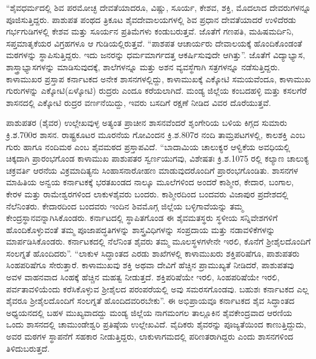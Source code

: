 “ಶೈವಧರ್ಮದಲ್ಲಿ ಶಿವ ಪರಮೋಚ್ಛ ದೇವತೆಯಾದರೂ, ವಿಷ್ಣು, ಸೂರ್ಯ, ಕೇಶವ, ಶಕ್ತಿ, ಮೊದಲಾದ ದೇವರುಗಳನ್ನೂ ಪೂಜಿಸುತ್ತಿದ್ದರು. ಪಾಶುಪತ ಪಂಥದ ತ್ರಿಕೂಟ ಶೈವದೇವಾಲಯಗಳಲ್ಲಿ ಶಿವ ಪ್ರಧಾನ ದೇವತೆಯಾದರೆ ಉಳಿದೆರಡು ಗರ್ಭಗುಡಿಗಳಲ್ಲಿ ಕೇಶವ ಮತ್ತು ಸೂರ್ಯನ ಪ್ರತಿಮೆಗಳು ಕಂಡುಬರುತ್ತವೆ. ಜೊತೆಗೆ ಗಣಪತಿ, ಮಹಿಷಮರ್ದಿನಿ, ಸಪ್ತಮಾತೃಕೆಯರ ವಿಗ್ರಹಗಳೂ ಆ ಗುಡಿಯಲ್ಲಿರುತ್ತವೆ. “ಪಾಶಪತ ಆಚಾರ್ಯರು ದೇವಾಲಯಕ್ಕೆ ಹೊಂದಿಕೊಂಡಂತೆ ಮಠಗಳನ್ನು ಸ್ಥಾಪಿಸುತ್ತಿದ್ದರು. ಇದು ಜನರನ್ನು ಧರ್ಮಮಾರ್ಗದತ್ತ ಆಕರ್ಷಿಸುವುದೇ ಆಗಿತ್ತು”. ಜೊತೆಗೆ ವಿದ್ಯಾಭ್ಯಾಸ, ಶಾಸ್ತ್ರಾಭ್ಯಾಸಗಳನ್ನು ಮಾಡಿಸುವುದಕ್ಕೆ, ಶಾಲೆಗಳನ್ನೂ ಮತ್ತು ಅಶನ ವ್ಯವಸ್ಥೆಗಾಗಿ ಸತ್ರಗಳನ್ನೂ ನಡೆಸುತ್ತಿದ್ದರು. ಕಾಳಾಮುಖರ ಪ್ರಸ್ತಾಪ ಕರ್ನಾಟಕದ ಅನೇಕ ಶಾಸನಗಳಲ್ಲಿದ್ದು, ಕಾಳಾಮುಖಕ್ಕೆ ಎಕ್ಕೋಟಿ ಸಮಯವೆಂದೂ, ಕಾಳಾಮುಖ ಗುರುಗಳನ್ನು ಎಕ್ಕೋಟಿ(ಏಳ್ಕೋಟಿ) ರುದ್ರರು ಎಂದೂ ಕರೆಯಲಾಗಿದೆ. ಮಂಡ್ಯ ಜಿಲ್ಲೆಯ ಕಂಬದಹಳ್ಳಿ ಮತ್ತು ಕಸಲಗೆರೆ ಶಾಸನದಲ್ಲಿ ಎಕ್ಕೋಟಿ ರುದ್ರರ ವರ್ಣನೆಯಿದ್ದು, ಇವರು ಬಸದಿಗೆ ರಕ್ಷಣೆ ನೀಡಿದ ವಿವರ ದೊರೆಯುತ್ತವೆ.

ಪಾಶುಪತರ (ಶೈವರ) ಉಲ್ಲೇಖವುಳ್ಳ ಅತ್ಯಂತ ಪ್ರಾಚೀನ ಶಾಸನವೆಂದರೆ ಶೃಂಗೇರಿಯ ಬಳಿಯ ಕಿಗ್ಗದ ಸುಮಾರು ಕ್ರಿ.ಶ.700ರ ಶಾಸನ. ರಾಷ್ಟ್ರಕೂಟರ ಮೂರನೆಯ ಗೋವಿಂದನ ಕ್ರಿ.ಶ.807ರ ನಂದಿ ತಾಮ್ರಪಟಗಳಲ್ಲಿ, ಕಾಲಶಕ್ತಿ ಎಂಬ ಗುರು ಹಾಗೂ ನಂದಿಮಠ ಎಂಬ ಶೈವಮಠದ ಪ್ರಸ್ತಾಪವಿದೆ. “ಬಾದಾಮಿಯ ಚಾಲುಕ್ಯರ ಆಳ್ವಿಕೆಯ ಅವಧಿಯಲ್ಲಿ ಚಿಕ್ಕದಾಗಿ ಪ್ರಾರಂಭಗೊಂಡ ಕಾಳಾಮುಖ ಪಾಶುಪತರ ಸ್ವರ್ಣಯುಗವು, ವಿಶೇಷತಃ ಕ್ರಿ.ಶ.1075 ರಲ್ಲಿ ಕಲ್ಯಾಣ ಚಾಲುಕ್ಯ ಚಕ್ರವರ್ತಿ ಆರನೆಯ ವಿಕ್ರಮಾದಿತ್ಯನು ಸಿಂಹಾಸನಾರೋಹಣ ಮಾಡುವುದರೊಂದಿಗೆ ಪ್ರಾರಂಭಗೊಂಡಿತು. ಶಾಸನಗಳ ಮಾಹಿತಿಯ ಅನ್ವಯ ಕರ್ನಾಟಕಕ್ಕೆ ಭರತಖಂಡದ ನಾಲ್ಕೂ ಮೂಲೆಗಳಿಂದ ಅಂದರೆ ಕಾಶ್ಮೀರ, ಕೇದಾರ, ಬಂಗಾಲ, ಕೇರಳ ಮತ್ತು ರಾಮೇಶ್ವರಗಳಿಂದ ಲಾಕುಳಶೈವರು ಬಂದರು. ಕಾಶ್ಮೀರದಿಂದ ಬಂದವರು ವಿಜಾಪುರ ಪ್ರದೇಶದಲ್ಲಿ ನೆಲೆನಿಂತರು. ಕೇದಾರದಿಂದ ಬಂದವರು ಇಂದಿನ ಶಿವಮೊಗ್ಗ ಜಿಲ್ಲೆಯ ಬಳ್ಳಿಗಾವೆಯನ್ನು ತಮ್ಮ ಕೇಂದ್ರಸ್ಥಾನವನ್ನಾಗಿಸಿಕೊಂಡರು. ಕರ್ನಾಟದಲ್ಲಿ ಸ್ಥಾಪಿತಗೊಂಡ ಈ ಶೈವಮತಸ್ಥರು ಸ್ಥಳೀಯ ಸನ್ನಿವೇಶಗಳಿಗೆ ಹೊಂದಿಕೊಳ್ಳುವಂತೆ ತಮ್ಮ ಪೂಜಾಪದ್ಧತಿಗಳನ್ನು ಶಾಸ್ತ್ರವಿಧಿಗಳನ್ನು ಸಂಪ್ರದಾಯ ಮತ್ತು ನಡಾವಳಿಕೆಗಳನ್ನು ಮಾರ್ಪಡಿಸಿಕೊಂಡರು. ಕರ್ನಾಟಕದಲ್ಲಿ ನೆಲೆನಿಂತ ಶೈವರು ತಮ್ಮ ಮೂಲಸ್ಥಳಗಳೇನೇ ಇರಲಿ, ಕೊನೆಗೆ ಶ‍್ರೀಶೈಲದೊಂದಿಗೆ ಸಂಲಗ್ನತೆ ಹೊಂದಿದರು”. “ಲಾಕುಳ ಸಿದ್ಧಾಂತದ ಎರಡು ಶಾಖೆಗಳಲ್ಲಿ ಕಾಳಾಮುಖರು ಶಕ್ತಿಪರಿಷೆಗೂ, ಪಾಶುಪತರು ಸಿಂಹಪರಿಷೆಗೂ ಸೇರುತ್ತಾರೆ. ಕಾಳಾಮುಖವು ಶಕ್ತಿ ಅಥವಾ ದೇವಿಗೆ ಹೆಚ್ಚಿನ ಪ್ರಾಮುಖ್ಯತೆ ನೀಡಿದರೆ, ಪಾಶುಪತವು ಅವಳ ವಾಹನವಾದ ಸಿಂಹಕ್ಕೆ ಹೆಚ್ಚಿನ ಮಹತ್ವ ನೀಡುತ್ತದೆ. ಶಕ್ತಿಪರಿಷೆಯೇ ಇರಲಿ, ಸಿಂಹಪರಿಷೆಯೇ ಇರಲಿ, ಪರ್ವತಾವಳಿಯೆಂದು ಕರೆಸಿಕೊಳ್ಳುವ ಶ‍್ರೀಶೈಲದ ಪರಂಪರೆಯಲ್ಲಿ ಅವು ಸಮರಸಗೊಂಡವು. ಬಹುಶಃ ಕರ್ನಾಟಕದ ಎಲ್ಲ ಶೈವರೂ ಶ‍್ರೀಶೈಲದೊಂದಿಗೆ ಸಂಲಗ್ನತೆ ಹೊಂದಿದವರಿರಬೇಕು”. ಈ ಅಭಿಪ್ರಾಯವೂ ಕರ್ನಾಟಕದ ಶೈವ ಸಿದ್ಧಾಂತದ ಅಧ್ಯಯನದಲ್ಲಿ ಬಹಳ ಮುಖ್ಯವಾದದ್ದು ಮಂಡ್ಯ ಜಿಲ್ಲೆಯ ನಾಗಮಂಗಲ ತಾಲ್ಲೂಕಿನ ಶೈವಕೇಂದ್ರವಾದ ಆರಣಿಯ ಒಂದು ಶಾಸನದಲ್ಲಿ ಚಾಮುಂಡೇಶ್ವರಿ ಪ್ರತಿಷ್ಠೆಯ ಉಲ್ಲೇಖವಿದೆ. ವೈದಿಕರು ಶೈವರನ್ನು ಪೂಜ್ಯತೆಯಿಂದ ಕಾಣುತ್ತಿದ್ದುದು, ಅವರ ಮಠಗಳ ಸ್ಥಾಪನೆಗೆ ಸಹಕಾರ ನೀಡುತ್ತಿದ್ದರು, ಲಾಕುಳಾಗಮದಲ್ಲಿ ಪರಿಣತರಾಗಿದ್ದರು ಎಂದು ಶಾಸನಗಳಿಂದ ತಿಳಿದುಬರುತ್ತದೆ.

